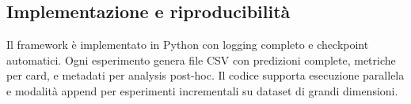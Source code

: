 \subsection{Implementazione e riproducibilità}

Il framework è implementato in Python con logging completo e checkpoint automatici. Ogni esperimento genera file CSV con predizioni complete, metriche per card, e metadati per analysis post-hoc. Il codice supporta esecuzione parallela e modalità append per esperimenti incrementali su dataset di grandi dimensioni.